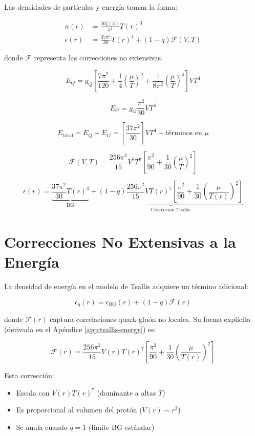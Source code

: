 Las densidades de partículas y energía toman la forma:

\begin{align}
n(r) &= \frac{16\zeta(3)}{\pi^2}T(r)^3 \label{eq-density} \\
\epsilon(r) &= \frac{37\pi^2}{30}T(r)^4 + (1-q)\mathcal{F}(V,T) \label{eq-energy}
\end{align}

donde $\mathcal{F}$ representa las correcciones no extensivas.

$$
E_Q = g_Q \left[\frac{7\pi^2}{120} + \frac{1}{4}\left(\frac{\mu}{T}\right)^2 + \frac{1}{8\pi^2}\left(\frac{\mu}{T}\right)^4\right]VT^4
$$

$$
E_G = g_G \frac{\pi^2}{30}VT^4
$$

$$
E_{\text{total}} = E_Q + E_G = \left[\frac{37\pi^2}{30}\right]VT^4 + \text{términos en }\mu
$$

$$
\mathcal{F}(V,T) = \frac{256\pi^2}{15} V^2 T^7 \left[\frac{\pi^2}{90} + \frac{1}{30}\left(\frac{\mu}{T}\right)^2\right]
$$


\begin{equation}
    \epsilon(r) = \underbrace{\frac{37\pi^2}{30}T(r)^4}_{\text{BG}} + \underbrace{(1-q)\frac{256\pi^2}{15}V T(r)^7\left[\frac{\pi^2}{90} + \frac{1}{30}\left(\frac{\mu}{T(r)}\right)^2\right]}_{\text{Corrección Tsallis}}
\end{equation}

\section{Correcciones No Extensivas a la Energía} \label{sec:correcciones-tsallis}
La densidad de energía en el modelo de Tsallis adquiere un término adicional:

\begin{equation}
\epsilon_q(r) = \epsilon_{\text{BG}}(r) + (1-q)\mathcal{F}(r)
\end{equation}

donde $\mathcal{F}(r)$ captura correlaciones quark-gluón no locales. Su forma explícita (derivada en el Apéndice \ref{app:tsallis-energy}) es:

\begin{equation} \label{eq:F-tsallis}
\mathcal{F}(r) = \frac{256\pi^2}{15}V(r)T(r)^7\left[\frac{\pi^2}{90} + \frac{1}{30}\left(\frac{\mu}{T(r)}\right)^2\right]
\end{equation}

\begin{physicalinsight}
Esta corrección:
\begin{itemize}
    \item Escala con $V(r)T(r)^7$ (dominante a altas $T$)
    \item Es proporcional al volumen del protón ($V(r) \sim r^3$)
    \item Se anula cuando $q=1$ (límite BG estándar)
\end{itemize}
\end{physicalinsight}

